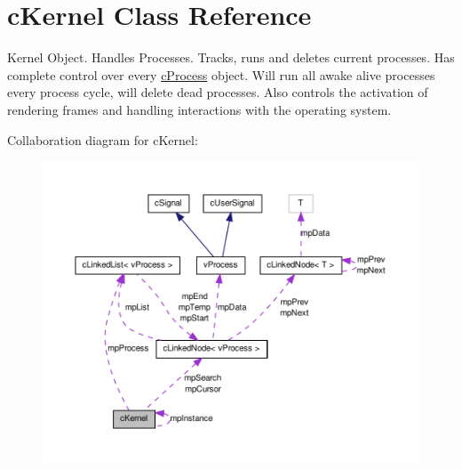 \hypertarget{classc_kernel}{
\section{cKernel Class Reference}
\label{classc_kernel}
}


Kernel Object. Handles Processes. Tracks, runs and deletes current processes. Has complete control over every \hyperlink{classc_process}{cProcess} object. Will run all awake alive processes every process cycle, will delete dead processes. Also controls the activation of rendering frames and handling interactions with the operating system.  




Collaboration diagram for cKernel:
\nopagebreak
\begin{figure}[H]
\begin{center}
\leavevmode
\includegraphics[width=400pt]{classc_kernel__coll__graph}
\end{center}
\end{figure}
